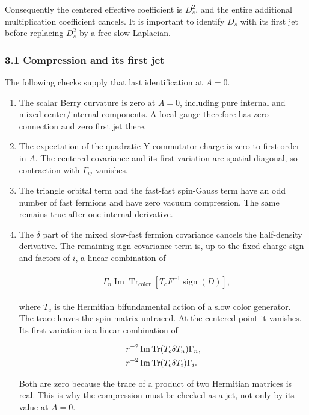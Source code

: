 Consequently the centered effective coefficient is \(D_{s}^{2}\), and
the entire additional multiplication coefficient cancels. It is
important to identify \(D_{s}\) with its first jet before replacing
\(D_{s}^{2}\) by a free slow Laplacian.

\subsubsection{3.1 Compression and its first
jet}\label{c-compression-and-its-first-jet}

The following checks supply that last identification at \(A=0\).

\begin{enumerate}
\def\labelenumi{\arabic{enumi}.}
\item
  The scalar Berry curvature is zero at \(A=0\), including pure internal
  and mixed center/internal components. A local gauge therefore has zero
  connection and zero first jet there.
\item
  The expectation of the quadratic-Y commutator charge is zero to first
  order in \(A\). The centered covariance and its first variation are
  spatial-diagonal, so contraction with \(\Gamma _{ij}\) vanishes.
\item
  The triangle orbital term and the fast-fast spin-Gauss term have an
  odd number of fast fermions and have zero vacuum compression. The same
  remains true after one internal derivative.
\item
  The \(\delta\) part of the mixed slow-fast fermion covariance cancels
  the half-density derivative. The remaining sign-covariance term is, up
  to the fixed charge sign and factors of \(i\), a linear combination of

  \begin{gather*}
  \begin{aligned}
  & \Gamma _{n} \operatorname{Im}  \operatorname{Tr} _{\mathrm{color}}[T_{c} F^{-1} \operatorname{sign} (D)],
  \end{aligned}\tag{3.5}
  \end{gather*}

  where \(T_{c}\) is the Hermitian bifundamental action of a slow color
  generator. The trace leaves the spin matrix untraced. At the centered
  point it vanishes. Its first variation is a linear combination of

  \begin{gather*}
  \begin{aligned}
  & r^{-2} \operatorname{Im}  \operatorname{Tr} (T_{c} \delta  T_{n}) \Gamma _{n}, \\
  & r^{-2} \operatorname{Im}  \operatorname{Tr} (T_{c} \delta  T_{i}) \Gamma _{i}.
  \end{aligned}\notag
  \end{gather*}

  Both are zero because the trace of a product of two Hermitian matrices
  is real. This is why the compression must be checked as a jet, not
  only by its value at \(A=0\).
\end{enumerate}

